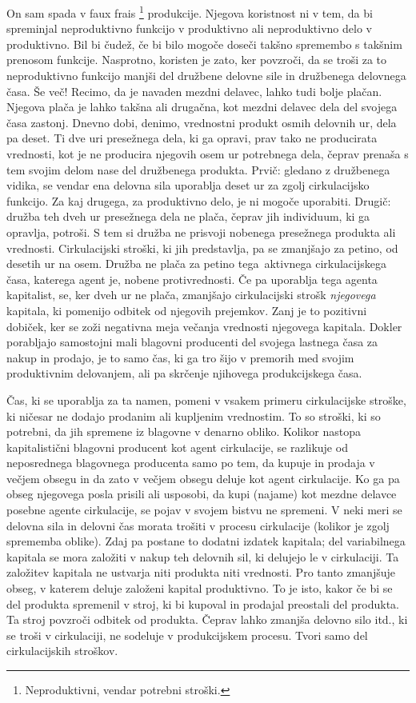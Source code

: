 \documentclass[kapital_02.tex]{subfiles}
\begin{document}
On sam spada v faux frais
\footnote{Neproduktivni, vendar potrebni stroški.} %
produkcije.
Njegova koristnost ni v tem, da bi spreminjal neproduktivno funkcijo v produktivno ali neproduktivno delo v produktivno.
Bil bi čudež, če bi bilo mogoče doseči takšno spremembo s takšnim prenosom funkcije.
Nasprotno, koristen je zato, ker povzroči, da se troši za to neproduktivno funkcijo manjši del družbene delovne sile in družbenega delovnega časa.
Še več!
Recimo, da je navaden mezdni delavec, lahko tudi bolje plačan.
Njegova plača je lahko takšna ali drugačna, kot mezdni delavec dela del svojega časa zastonj.
Dnevno dobi, denimo, vrednostni produkt osmih delovnih ur, dela pa deset.
Ti dve uri presežnega dela, ki ga opravi, prav tako ne producirata vrednosti, kot je ne producira njegovih osem ur potrebnega dela, čeprav prenaša s tem svojim delom nase del družbenega produkta.
Prvič: gledano z družbenega vidika, se vendar ena delovna sila uporablja deset ur za zgolj cirkulacijsko funkcijo.
Za kaj drugega, za produktivno delo, je ni mogoče uporabiti. Drugič: družba teh dveh ur presežnega dela ne plača, čeprav jih individuum, ki ga opravlja, potroši.
S tem si družba ne prisvoji nobenega presežnega produkta ali vrednosti.
Cirkulacijski stroški, ki jih predstavlja, pa se zmanjšajo za petino, od desetih ur na osem.
Družba ne plača za petino tega\KPEstran\ aktivnega cirkulacijskega časa, katerega agent je, nobene protivrednosti. Če pa uporablja tega agenta kapitalist, se, ker dveh ur ne plača, zmanjšajo cirkulacijski strošk \emph{njegovega} kapitala, ki pomenijo odbitek od njegovih prejemkov.
Zanj je to pozitivni dobiček, ker se zoži negativna meja večanja vrednosti njegovega kapitala.
Dokler porabljajo samostojni mali blagovni producenti del svojega lastnega časa za nakup in prodajo, je to samo čas, ki ga tro šijo v premorih med svojim produktivnim delovanjem, ali pa skrčenje njihovega produkcijskega časa.

Čas, ki se uporablja za ta namen, pomeni v vsakem primeru cirkulacijske stroške, ki ničesar ne dodajo prodanim ali kupljenim vrednostim.
To so stroški, ki so potrebni, da jih spremene iz blagovne v denarno obliko. 
Kolikor nastopa kapitalistični blagovni producent kot agent cirkulacije, se razlikuje od neposrednega blagovnega producenta samo po tem, da kupuje in prodaja v večjem obsegu in da zato v večjem obsegu deluje kot agent cirkulacije.
Ko ga pa obseg njegovega posla prisili ali usposobi, da kupi (najame) kot mezdne delavce posebne agente cirkulacije, se pojav v svojem bistvu ne spremeni.
V neki meri se delovna sila in delovni čas morata trošiti v procesu cirkulacije (kolikor je zgolj sprememba oblike). 
Zdaj pa postane to dodatni izdatek kapitala; del variabilnega kapitala se mora založiti v nakup teh delovnih sil, ki delujejo le v cirkulaciji.
Ta založitev kapitala ne ustvarja niti produkta niti vrednosti.
Pro tanto zmanjšuje obseg, v katerem deluje založeni kapital produktivno.
To je isto, kakor če bi se del produkta spremenil v stroj, ki bi kupoval in prodajal preostali del produkta.
Ta stroj povzroči odbitek od produkta.
Čeprav lahko zmanjša delovno silo itd., ki se troši v cirkulaciji, ne sodeluje v produkcijskem procesu.
Tvori samo del cirkulacijskih stroškov.
\end{document}
